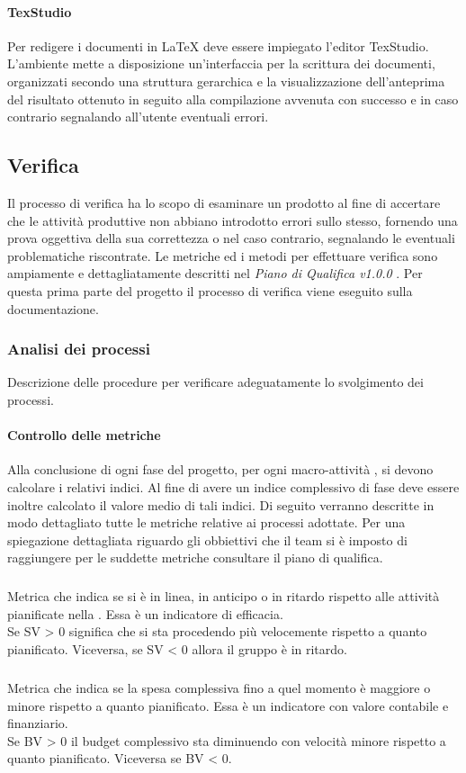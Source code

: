 \paragraph{TexStudio} \Spazio
Per redigere i documenti in \LaTeX \emph{ }deve essere impiegato l'editor TexStudio. L'ambiente mette a disposizione un'interfaccia per la scrittura dei documenti, organizzati secondo una struttura gerarchica e la visualizzazione dell'anteprima del risultato ottenuto in seguito alla compilazione avvenuta con successo e in caso contrario segnalando all'utente eventuali errori.


\subsection{Verifica}
Il processo di verifica ha lo scopo di esaminare un prodotto al fine di accertare che le attività produttive non abbiano introdotto errori sullo stesso, fornendo una prova oggettiva della sua correttezza o nel caso contrario, segnalando le eventuali problematiche riscontrate. Le metriche ed i metodi per effettuare verifica sono ampiamente e dettagliatamente descritti nel \emph{Piano di Qualifica v1.0.0} . Per questa prima parte del progetto il processo di verifica viene eseguito sulla documentazione.

\subsubsection{Analisi dei processi}
Descrizione delle procedure per verificare adeguatamente lo svolgimento dei processi.

\paragraph{Controllo delle metriche} \Spazio
Alla conclusione di ogni fase del progetto, per ogni macro-attività , si devono calcolare i relativi indici. Al fine di avere un indice complessivo di fase deve essere inoltre calcolato il valore medio
di tali indici. Di seguito verranno descritte in modo dettagliato tutte le metriche relative ai processi adottate. Per una spiegazione dettagliata riguardo gli obbiettivi che il team si è imposto di raggiungere per le suddette metriche consultare il piano di qualifica.
\subparagraph{}\Spazio
Metrica che indica se si è in linea, in anticipo o in ritardo rispetto alle attività pianificate nella . Essa è un indicatore di efficacia. \\
Se SV > 0 significa che si sta procedendo più velocemente rispetto a quanto pianificato. Viceversa, se SV < 0 allora il gruppo è in ritardo. 
\subparagraph{}\Spazio
Metrica che indica se la spesa complessiva fino a quel momento è maggiore o minore rispetto a quanto pianificato. Essa è un indicatore con valore contabile e finanziario. \\
Se BV > 0 il budget complessivo sta diminuendo con velocità minore rispetto a quanto pianificato. Viceversa se BV < 0.

